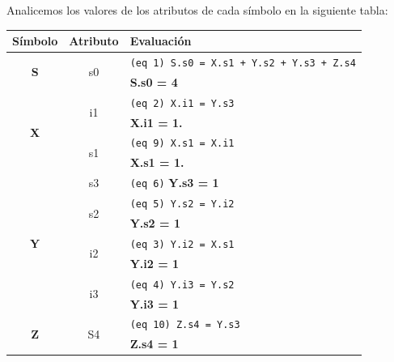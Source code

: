 Analicemos los valores de los atributos de cada símbolo en la siguiente tabla:

\begin{center}\begin{tabular}{|| c | c | l ||}
\hline \hline

\rowcolor{gris} \textbf{Símbolo}&\textbf{Atributo}&\textbf{Evaluación}\\ \hline

\multirow{2}{*}{\textbf{S}} & \multirow{2}{*}{s0} & \texttt{(eq 1) S.s0 = X.s1 + Y.s2 + Y.s3 + Z.s4} \\ 
                           &                     & \textbf{S.s0 = 4} \\ \hline

\multirow{4}{*}{\textbf{X}} & \multirow{2}{*}{i1} & \texttt{(eq 2) X.i1 = Y.s3} \\ 
                           &                     & \textbf{X.i1 = 1.} \\ \cline{2-3}
                           & \multirow{2}{*}{s1} & \texttt{(eq 9) X.s1 = X.i1} \\ 
                           &                     & \textbf{X.s1 = 1.} \\ \hline

\multirow{7}{*}{\textbf{Y}} &                 s3  & \texttt{(eq 6)} \textbf{Y.s3 = 1} \\ \cline{2-3}
                           & \multirow{2}{*}{s2} &    \texttt{(eq 5) Y.s2 = Y.i2} \\
                           &                     & \textbf{Y.s2 = 1} \\ \cline{2-3}
                           & \multirow{2}{*}{i2} & \texttt{(eq 3) Y.i2 = X.s1} \\
                           &                     & \textbf{Y.i2 = 1} \\ \cline{2-3}
                           & \multirow{2}{*}{i3} & \texttt{(eq 4) Y.i3 = Y.s2} \\
                           &                     & \textbf{Y.i3 = 1} \\ \hline

\multirow{2}{*}{\textbf{Z}} & \multirow{2}{*}{S4} & \texttt{(eq 10) Z.s4 = Y.s3} \\
                           &                     & \textbf{Z.s4 = 1} \\ \hline


\end{tabular}
\end{center}
